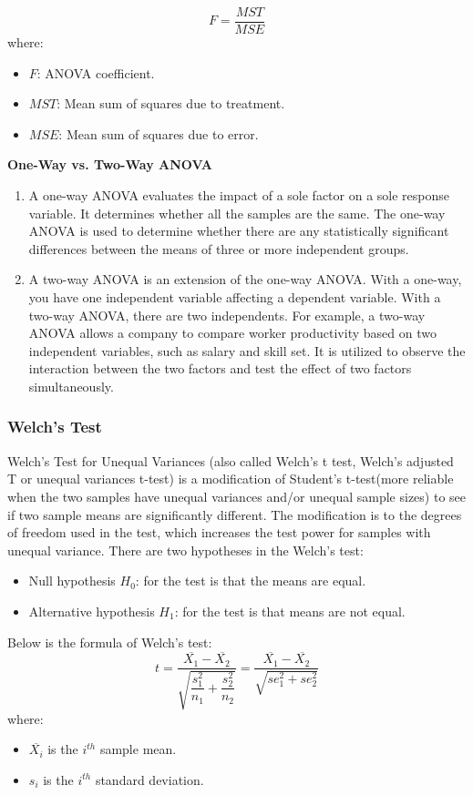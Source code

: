 \documentclass[a4paper]{article}
\theoremstyle{definition}
\begin{document}
\begin{equation*}
    F = \frac{MST}{MSE}
\end{equation*}
where:
\begin{itemize}
    \item $F$: ANOVA coefficient.
    \item $MST$: Mean sum of squares due to treatment.
    \item $MSE$: Mean sum of squares due to error.
\end{itemize}





\textbf{One-Way vs. Two-Way ANOVA}
\begin{enumerate}
    \item A one-way ANOVA evaluates the impact of a sole factor on a sole response variable. It determines whether all the samples are the same. The one-way ANOVA is used to determine whether there are any statistically significant differences between the means of three or more independent groups.

    \item A two-way ANOVA is an extension of the one-way ANOVA. With a one-way, you have one independent variable affecting a dependent variable. With a two-way ANOVA, there are two independents. For example, a two-way ANOVA allows a company to compare worker productivity based on two independent variables, such as salary and skill set. It is utilized to observe the interaction between the two factors and test the effect of two factors simultaneously.
\end{enumerate}
\subsubsection{Welch’s Test}
Welch’s Test for Unequal Variances (also called Welch’s t test, Welch’s adjusted T or unequal variances t-test) is a modification of Student’s t-test(more reliable when the two samples have unequal variances and/or unequal sample sizes) to see if two sample means are significantly different. The modification is to the degrees of freedom used in the test, which increases the test power for samples with unequal variance. There are two hypotheses in the Welch’s test:

\begin{itemize}
    \item Null hypothesis $H_0$: for the test is that the means are equal.
    \item Alternative hypothesis $H_1$: for the test is that means are not equal.
\end{itemize}
Below is the formula of Welch’s test:
\begin{equation*}
    t = \dfrac{\overline{X_1}-\overline{X_2}}{\sqrt{\dfrac{s^2_1}{n_1}+\dfrac{s^2_2}{n_2}}}=\dfrac{\overline{X_1}-\overline{X_2}}{\sqrt{se^2_1+se^2_2}}
\end{equation*}
where:
\begin{itemize}
    \item $\overline{X_i}$ is the $i^{th}$ sample mean.
    \item $s_i$ is the $i^{th}$ standard deviation.
\end{itemize}
\pagebreak
\end{document}
